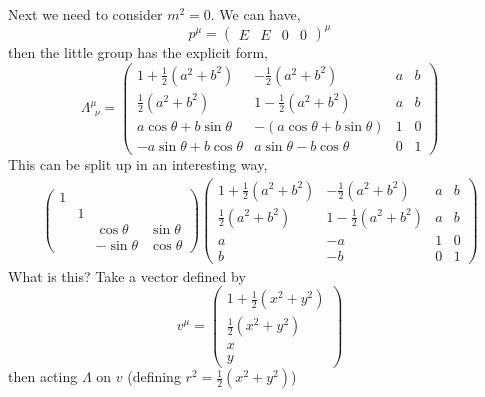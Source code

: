 Next we need to consider $m^2=0$. We can have,
\begin{equation}
    p^{\mu} = \begin{pmatrix}
        E & E& 0 &0
    \end{pmatrix}^{\mu}
\end{equation}
then the little group has the explicit form,
\begin{equation}
    \Lambda^{\mu}_{\ \ \nu} = \begin{pmatrix}
       1 + \frac{1}{2}(a^2+b^2) & -\frac{1}{2}(a^2+b^2)  &a&b \\
        \frac{1}{2}(a^2+b^2) & 1-\frac{1}{2}(a^2+b^2)  & a & b \\
       a\cos\theta + b\sin\theta & -(a\cos\theta + b\sin\theta)  & 1 & 0 \\
       -a\sin\theta + b\cos\theta  & a\sin\theta -b\cos\theta & 0 & 1
    \end{pmatrix}
\end{equation}
This can be split up in an interesting way, 
\begin{equation}
    \begin{split}
        \begin{pmatrix}
       1 &   &  & \\
         & 1 &  &  \\
         &   & \cos\theta & \sin\theta \\
         &   & -\sin\theta & \cos\theta
    \end{pmatrix}
    \begin{pmatrix}1 + \frac{1}{2}(a^2+b^2) & -\frac{1}{2}(a^2+b^2)  & a & b\\
        \frac{1}{2}(a^2+b^2) & 1-\frac{1}{2}(a^2+b^2)  & a & b \\
       a& -a  & 1 & 0 \\
       b & -b& 0 & 1
    \end{pmatrix}
    \end{split}
\end{equation}
What is this? Take a vector defined by
\begin{equation}
    v^{\mu} = \begin{pmatrix}
        1 + \frac{1}{2}(x^2+y^2)\\
        \frac{1}{2}(x^2+y^2)\\
        x\\
        y
    \end{pmatrix}
\end{equation}
then acting $\Lambda$ on $v$ (defining $r^2 = \frac{1}{2}(x^2 + y^2)$)
